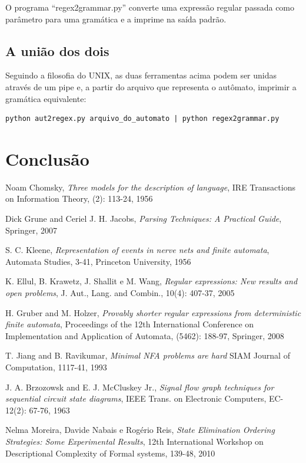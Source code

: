 \documentclass[a4 paper, 12pt]{article}
\begin{document}
O programa ``regex2grammar.py'' converte uma express\~ao regular
passada como par\^ametro para uma gram\'atica e a imprime na sa\'ida
padr\~ao.

\subsection{A uni\~ao dos dois}
Seguindo a filosofia do UNIX, as duas ferramentas acima podem ser
unidas atrav\'es de um pipe e, a partir do arquivo que representa o
aut\^omato, imprimir a gram\'atica equivalente:
\begin{verbatim}
python aut2regex.py arquivo_do_automato | python regex2grammar.py
\end{verbatim}

\section{Conclus\~ao}

\newpage
\begin{thebibliography}{99}

  Noam Chomsky,
  \emph{Three models for the description of language},
  IRE Transactions on Information Theory,
  (2): 113-24,
  1956

  Dick Grune and Ceriel J. H. Jacobs,
  \emph{Parsing Techniques: A Practical Guide},
  Springer,
  2007

  S. C. Kleene,
  \emph{Representation of events in nerve nets and finite automata},
  Automata Studies,
  3-41,
  Princeton University,
  1956

  K. Ellul, B. Krawetz, J. Shallit e M. Wang,
  \emph{Regular expressions: New results and open problems},
  J. Aut., Lang. and Combin.,
  10(4): 407-37,
  2005

  H. Gruber and M. Holzer,
  \emph{Provably shorter regular expressions from deterministic finite
  automata},
Proceedings of the 12th International Conference on Implementation and
Application of Automata,
(5462): 188-97,
Springer,
2008

  T. Jiang and B. Ravikumar,
  \emph{Minimal NFA problems are hard}
  SIAM Journal of Computation,
  1117-41,
  1993

  J. A. Brzozowsk and E. J. McCluskey Jr.,
  \emph{Signal flow graph techniques for sequential circuit state
    diagrams},
  IEEE Trans. on Electronic Computers,
  EC-12(2): 67-76,
  1963

  Nelma Moreira, Davide Nabais e Rog\'erio Reis,
  \emph{State Elimination Ordering Strategies: Some Experimental
    Results},
  12th International Workshop on Descriptional Complexity of Formal
  systems,
  139-48,
  2010
\end{thebibliography}
\end{document}
